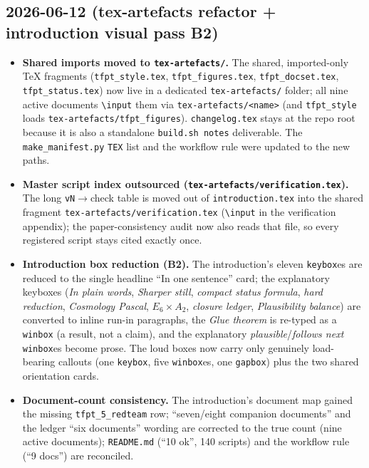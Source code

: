 \documentclass[11pt]{article}
\begin{document}
\subsection*{2026-06-12 (tex-artefacts refactor + introduction visual pass B2)}
\begin{itemize}
\item \textbf{Shared imports moved to \texttt{tex-artefacts/}.} The shared, imported-only TeX
  fragments (\texttt{tfpt\_style.tex}, \texttt{tfpt\_figures.tex}, \texttt{tfpt\_docset.tex},
  \texttt{tfpt\_status.tex}) now live in a dedicated \texttt{tex-artefacts/} folder; all nine active
  documents \texttt{\textbackslash input} them via \texttt{tex-artefacts/<name>} (and
  \texttt{tfpt\_style} loads \texttt{tex-artefacts/tfpt\_figures}). \texttt{changelog.tex} stays at the
  repo root because it is also a standalone \texttt{build.sh notes} deliverable. The
  \texttt{make\_manifest.py} \texttt{TEX} list and the workflow rule were updated to the new paths.
\item \textbf{Master script index outsourced (\texttt{tex-artefacts/verification.tex}).} The long
  \texttt{vN}$\to$check table is moved out of \texttt{introduction.tex} into the shared fragment
  \texttt{tex-artefacts/verification.tex} (\texttt{\textbackslash input} in the verification appendix);
  the paper-consistency audit now also reads that file, so every registered script stays cited exactly
  once.
\item \textbf{Introduction box reduction (B2).} The introduction's eleven \texttt{keybox}es are reduced
  to the single headline ``In one sentence'' card; the explanatory keyboxes (\emph{In plain words},
  \emph{Sharper still}, \emph{compact status formula}, \emph{hard reduction}, \emph{Cosmology Pascal},
  \emph{$E_6{\times}A_2$}, \emph{closure ledger}, \emph{Plausibility balance}) are converted to inline
  run-in paragraphs, the \emph{Glue theorem} is re-typed as a \texttt{winbox} (a result, not a claim),
  and the explanatory \emph{plausible}/\emph{follows next} \texttt{winbox}es become prose. The loud
  boxes now carry only genuinely load-bearing callouts (one \texttt{keybox}, five \texttt{winbox}es,
  one \texttt{gapbox}) plus the two shared orientation cards.
\item \textbf{Document-count consistency.} The introduction's document map gained the missing
  \texttt{tfpt\_5\_redteam} row; ``seven/eight companion documents'' and the ledger ``six documents''
  wording are corrected to the true count (nine active documents); \texttt{README.md} (``10 ok'', 140
  scripts) and the workflow rule (``9 docs'') are reconciled.
\end{itemize}
\end{document}

